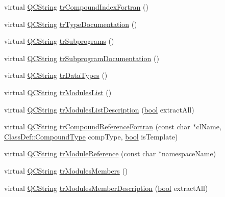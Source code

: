 \begin{DoxyCompactItemize}
\item 
virtual \hyperlink{class_q_c_string}{Q\+C\+String} \hyperlink{class_translator_chinese_a4b4771837d68a9d9aa2f4950d0e05c82}{tr\+Compound\+Index\+Fortran} ()
\item 
virtual \hyperlink{class_q_c_string}{Q\+C\+String} \hyperlink{class_translator_chinese_ad7774d0b6f934b0bc8ee4b9f3d2e2bfc}{tr\+Type\+Documentation} ()
\item 
virtual \hyperlink{class_q_c_string}{Q\+C\+String} \hyperlink{class_translator_chinese_a928e1e68399241494a874d409dadf304}{tr\+Subprograms} ()
\item 
virtual \hyperlink{class_q_c_string}{Q\+C\+String} \hyperlink{class_translator_chinese_a629a2e317851be06837a5e7d0b285bf0}{tr\+Subprogram\+Documentation} ()
\item 
virtual \hyperlink{class_q_c_string}{Q\+C\+String} \hyperlink{class_translator_chinese_a6d8814bd6b69896ad0209dd6ba075cf7}{tr\+Data\+Types} ()
\item 
virtual \hyperlink{class_q_c_string}{Q\+C\+String} \hyperlink{class_translator_chinese_a392a4635cdeb71c8906f57e80e7cc131}{tr\+Modules\+List} ()
\item 
virtual \hyperlink{class_q_c_string}{Q\+C\+String} \hyperlink{class_translator_chinese_afd29bf2ca31ad924bb9c8d0baa73a0c3}{tr\+Modules\+List\+Description} (\hyperlink{qglobal_8h_a1062901a7428fdd9c7f180f5e01ea056}{bool} extract\+All)
\item 
virtual \hyperlink{class_q_c_string}{Q\+C\+String} \hyperlink{class_translator_chinese_a31f0f3d3861a8c43aadb9e55ee24048a}{tr\+Compound\+Reference\+Fortran} (const char $\ast$cl\+Name, \hyperlink{class_class_def_ae70cf86d35fe954a94c566fbcfc87939}{Class\+Def\+::\+Compound\+Type} comp\+Type, \hyperlink{qglobal_8h_a1062901a7428fdd9c7f180f5e01ea056}{bool} is\+Template)
\item 
virtual \hyperlink{class_q_c_string}{Q\+C\+String} \hyperlink{class_translator_chinese_a9dad8400318638a97741ea6548d63ab6}{tr\+Module\+Reference} (const char $\ast$namespace\+Name)
\item 
virtual \hyperlink{class_q_c_string}{Q\+C\+String} \hyperlink{class_translator_chinese_acef3e40d4f7cdc93177e46a5051e4dac}{tr\+Modules\+Members} ()
\item 
virtual \hyperlink{class_q_c_string}{Q\+C\+String} \hyperlink{class_translator_chinese_aa11d57b205557658c5ab3851b28590d8}{tr\+Modules\+Member\+Description} (\hyperlink{qglobal_8h_a1062901a7428fdd9c7f180f5e01ea056}{bool} extract\+All)
\item 

\end{DoxyCompactItemize}
